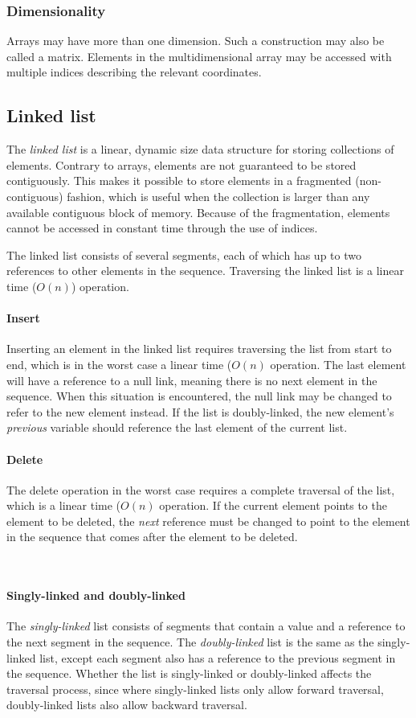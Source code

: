 \documentclass{article}
\begin{document}
\subsubsection{Dimensionality}
Arrays may have more than one dimension. Such a construction may also be called a matrix.
Elements in the multidimensional array may be accessed with multiple indices describing the relevant coordinates.


\subsection{Linked list}
The {\em linked list} is a linear, dynamic size data structure for storing collections of elements.
Contrary to arrays, elements are not guaranteed to be stored contiguously.
This makes it possible to store elements in a fragmented (non-contiguous) fashion,
which is useful when the collection is larger than any available contiguous block of memory.
Because of the fragmentation, elements cannot be accessed in constant time through the use of indices.

The linked list consists of several segments,
each of which has up to two references to other elements in the sequence.
Traversing the linked list is a linear time (\(O(n)\)) operation.

\paragraph{Insert}
Inserting an element in the linked list requires traversing the list from start to end,
which is in the worst case a linear time (\(O(n)\) operation.
The last element will have a reference to a null link, meaning there is no next element in the sequence.
When this situation is encountered, the null link may be changed to refer to the new element instead.
If the list is doubly-linked, the new element's {\em previous} variable should reference the last element of the current list.

\paragraph{Delete}
The delete operation in the worst case requires a complete traversal of the list,
which is a linear time (\(O(n)\) operation. If the current element points to the element to be deleted,
the {\em next} reference must be changed to point to the element in the sequence that comes after the element to be deleted.

\
\paragraph{Singly-linked and doubly-linked}
The {\em singly-linked} list consists of segments that contain a value and a reference to the next segment in the sequence.
The {\em doubly-linked} list is the same as the singly-linked list, except each segment also has a reference to the previous segment in the sequence.
Whether the list is singly-linked or doubly-linked affects the traversal process,
since where singly-linked lists only allow forward traversal, doubly-linked lists also allow backward traversal.
\end{document}
